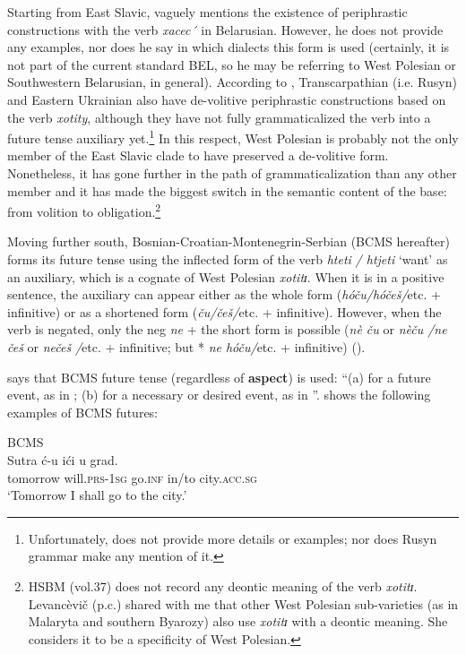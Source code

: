 \documentclass[output=paper,colorlinks,citecolor=brown]{langscibook}
\begin{document}
Starting from East Slavic, \citet{Mackevic1959} vaguely mentions the existence of periphrastic constructions with the verb \textit{xacec´} in Belarusian. However, he does not provide any examples, nor does he say in which dialects this form is used (certainly, it is not part of the current standard BEL, so he may be referring to West Polesian or Southwestern Belarusian, in general). According to \citet[154]{Danylenko2011}, Transcarpathian (i.e. Rusyn) and Eastern Ukrainian also have de-volitive periphrastic constructions based on the verb \textit{xotity}, although they have not fully grammaticalized the verb into a future tense auxiliary yet.\footnote{Unfortunately, \citet{Danylenko2011} does not provide more details or examples; nor does  Rusyn grammar make any mention of it.} In this respect, West Polesian is probably not the only member of the East Slavic clade to have preserved a de-volitive form. Nonetheless, it has gone further in the path of grammaticalization than any other member and it has made the biggest switch in the semantic content of the base: from volition to obligation.\footnote{HSBM (vol.37) does not record any deontic meaning of the verb \textit{xotitɪ}. Levancèvič (p.c.) shared with me that other West Polesian sub-varieties (as in Malaryta and southern Byarozy) also use \textit{xotitɪ} with a deontic meaning. She considers it to be a specificity of West Polesian.}

Moving further south, Bosnian-Croatian-Montenegrin-Serbian (BCMS hereafter) forms its future tense using the inflected form of the verb \textit{hteti}\textit{ / htjeti} ‘want’ as an auxiliary, which is a cognate of West Polesian \textit{xotitɪ}. When it is in a positive sentence, the auxiliary can appear either as the whole form (\textit{hóču/hóčeš/}etc. + infinitive) or as a shortened form (\textit{ču/češ/}etc. + infinitive). However, when the verb is negated, only the neg \textit{ne} + the short form is possible (\textit{nè ču }or \textit{nèču /ne češ }or \textit{nečeš} \textit{/}etc. + infinitive; but *\textit{ ne hóču/}etc. + infinitive) (\cite[143--144]{Alexander2006}).

\citet[186, 189, 190]{Gvozdanovic1995} says that BCMS future tense (regardless of \textbf{aspect}) is used: “(a) for a future event, as in ; (b) for a necessary or desired event, as in ”. \citet[186]{Gvozdanovic1995} shows the following examples of BCMS futures:

\ea \label{ex:roncero:22}
    BCMS \citep[186]{Gvozdanovic1995}\\
    \gll Sutra ć-u ići u grad.\\
    tomorrow will.\textsc{prs-1sg} go.\textsc{inf} in/to city.\textsc{acc.sg}\\
    \glt ‘Tomorrow I shall go to the city.’
\z
\end{document}
